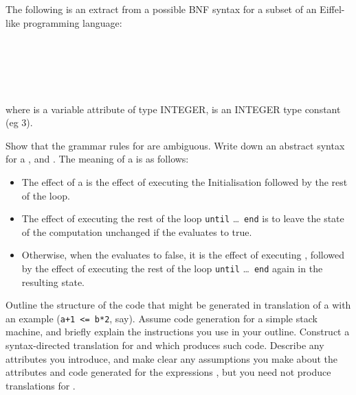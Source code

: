 \begin{questions}
The following is an extract from a possible BNF syntax for
a subset of an Eiffel-like programming language: 
\begin{bnf}
 \\
 \\
\\
\\
\end{bnf}
where  is a variable attribute of type INTEGER, 
is an INTEGER type constant (eg 3).
\begin{subquestions}
\subquestion
Show that the grammar rules for  are ambiguous. 
\subquestion
Write down an abstract syntax for a ,  and .
\subquestion
The meaning of a  is as follows:
\begin{itemize}
\item The effect of a  is the effect of executing 
	the Initialisation 
	followed by the rest of the loop.
\item The effect of executing the rest of the loop
	\verb|until| \ldots\ \verb|end|
	is to leave the
	state of the computation unchanged if the 
	evaluates to true.
\item Otherwise, when the  evaluates to false,
	it is the effect of executing ,
	followed by the effect of executing the rest of the loop
	\verb|until| \ldots\ \verb|end| again in the resulting state.
\end{itemize}
\begin{subsubquestions}
\subsubquestion
	Outline the structure of the
        code that might be generated in translation of
        a  with an example  (\verb"a+1 <= b*2", say). 
	Assume code generation for a simple
        stack machine, and briefly explain the
	instructions you use in your outline.
\subsubquestion
        Construct a syntax-directed translation for 
         and  which produces such code.
        Describe any attributes you
        introduce, and make clear any assumptions you make about 
        the attributes and code generated for the
        expressions , but you need not produce translations for
	.
\end{subsubquestions}


\end{subquestions}
\end{questions}
